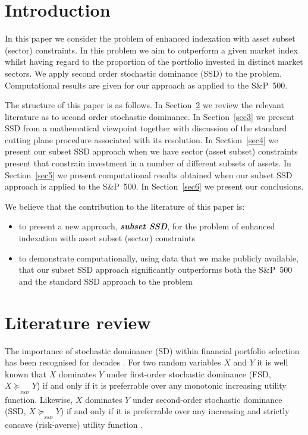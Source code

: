 \section{Introduction}

In this paper we consider the problem of enhanced indexation with asset subset (sector) constraints. In this problem we aim to 
outperform a given market index whilst having regard to the proportion of the portfolio invested in distinct market sectors. We apply second 
order stochastic dominance (SSD) to the problem. Computational results are given for our approach as applied to the S\&P~500.


The structure of this paper is as follows. In Section~\ref{sec2} we review the relevant literature as to second order stochastic 
dominance. In Section~\ref{sec3} we
 present SSD from a mathematical viewpoint together with discussion of  the standard cutting plane 
procedure associated with its resolution. 
In Section~\ref{sec4} we present our subset SSD approach  when we have sector (asset subset) constraints present that constrain 
investment in a number of different subsets of assets. In Section~\ref{sec5} we present computational results obtained 
when our subset SSD approach is applied to the S\&P~500. In Section~\ref{sec6} we present our conclusions.

\sloppy We believe that the contribution to the literature of this paper is:
\begin{itemize}
\item to present a new approach, \emph{\textbf{subset SSD}}, for the problem of enhanced indexation with asset subset (sector) constraints
\item to demonstrate computationally,
using data that we make publicly available,  
 that our subset SSD approach significantly outperforms both the  S\&P~500 and the standard SSD approach to the problem
\end{itemize}

\section{Literature review}
\label{sec2}

\sloppy The importance of stochastic dominance (SD) within financial portfolio selection has been recognised for decades \citep{hadar1969, bawa1975, levy1992}. For two 
random variables $X$ and $Y$ it is well known that $X$ dominates $Y$ under first-order stochastic
 dominance (FSD, $ X \succeq_{_{FSD}} Y$) if and only if it is preferrable over any monotonic increasing utility function. Likewise, $X$ dominates $Y$ under
 second-order stochastic dominance (SSD, $ X \succeq_{_{SSD}} Y$) if and only if it is preferrable over any increasing and strictly concave (risk-averse) utility function \citep{whitmore1978}.

